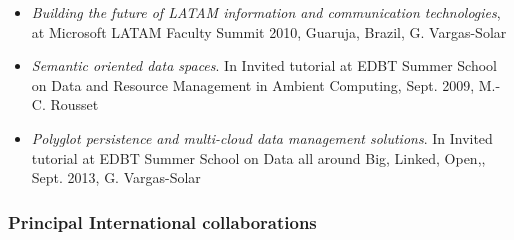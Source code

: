 \begin{itemize}
\item \emph{Building the future of LATAM information and communication technologies}, at Microsoft LATAM Faculty Summit 2010, Guaruja, Brazil, G. 
Vargas-Solar






\item \emph{Semantic oriented data spaces}. In Invited tutorial at EDBT Summer School on Data and Resource Management in Ambient Computing, Sept. 2009, M.-C. Rousset

\item \emph{Polyglot persistence and multi-cloud data management solutions}. In Invited tutorial at EDBT Summer School on Data all around
Big, Linked, Open,, Sept. 2013, G. Vargas-Solar 


\end{itemize}



\subsubsection{Principal International collaborations}

